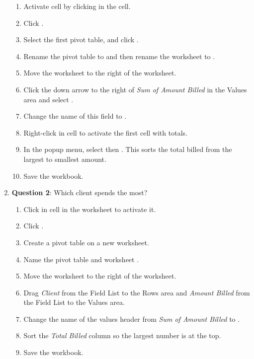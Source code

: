 \begin{enumerate}
	\begin{enumerate}
		\item Activate cell  by clicking in the cell.
		\item Click .	
		\item Select the first pivot table,  and click .
		\item Rename the pivot table to  and then rename the worksheet to .
		\item Move the  worksheet to the right of the  worksheet.
		\item Click the down arrow to the right of \textit{Sum of Amount Billed} in the Values area and select .
		\item Change the name of this field to .
		\item Right-click in cell  to activate the first cell with totals.
		\item In the popup menu, select  then . This sorts the total billed from the largest to smallest amount.
		\item Save the workbook.
	\end{enumerate}

	\item{\textbf{Question 2}: Which client spends the most?	}

	\begin{enumerate}
		\item Click in cell  in the  worksheet to activate it.
		\item Click .
		\item Create a pivot table on a new worksheet.
		\item Name the pivot table and worksheet .
		\item Move the  worksheet to the right of the  worksheet.
		\item Drag \textit{Client} from the Field List to the Rows area and \textit{Amount Billed} from the Field List to the Values area.
		\item Change the name of the values header from \textit{Sum of Amount Billed} to .
		\item Sort the \textit{Total Billed} column so the largest number is at the top.
		\item Save the workbook.
	\end{enumerate}


\end{enumerate}
